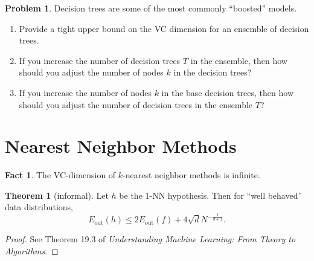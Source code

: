 \documentclass[10pt]{exam}
\theoremstyle{definition}
\newtheorem{problem}{Problem}
\newtheorem{fact}{Fact}
\newtheorem{theorem}{Theorem}
\newcommand{\Eout}{E_{\text{out}}}
\begin{document}

\newpage
\begin{problem}
    Decision trees are some of the most commonly ``boosted'' models.
    \begin{enumerate}
        \item
        Provide a tight upper bound on the VC dimension for an ensemble of decision trees.
            \vspace{3in}
        \item
            If you increase the number of decision trees $T$ in the ensemble, 
            then how should you adjust the number of nodes $k$ in the decision trees?
            \vspace{3in}
        \item
            If you increase the number of nodes $k$ in the base decision trees,
            then how should you adjust the number of decision trees in the ensemble $T$?
    \end{enumerate}
\end{problem}

\newpage
\section*{Nearest Neighbor Methods}

\begin{fact}
    The VC-dimension of $k$-nearest neighbor methods is infinite.
\end{fact}

\begin{theorem}[informal]
    Let $h$ be the 1-NN hypothesis.
    Then for ``well behaved'' data distributions,
    \begin{equation}
        \Eout(h) \le 2 \Eout(f) + 4 \sqrt{d}N^{-\frac{1}{d+1}}.
    \end{equation}
\end{theorem}
\begin{proof}
See Theorem 19.3 of \emph{Understanding Machine Learning: From Theory to Algorithms}.
\end{proof}

\end{document}
